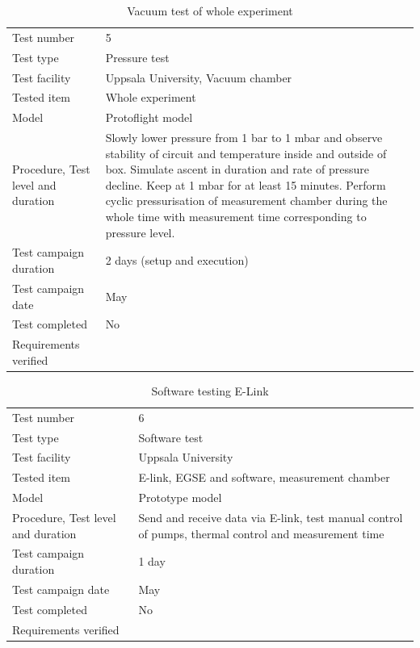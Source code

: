 \documentclass[12pt,a4paper]{report}
\begin{document}
\begin{table}[H]
\centering
\caption{Vacuum test of whole experiment}
\label{tab:vacuum_test}
\begin{tabular}{L{5cm}L{10cm}}
\toprule
Test number & 5 \\
Test type & Pressure test \\
Test facility & Uppsala University, Vacuum chamber \\
Tested item & Whole experiment \\
Model & Protoflight model \\
Procedure, Test level and duration & Slowly lower pressure from 1 bar to 1 mbar and observe stability of circuit and temperature inside and outside of box. Simulate ascent in duration and rate of pressure decline. Keep at 1 mbar for at least 15 minutes. Perform cyclic pressurisation of measurement chamber during the whole time with measurement time corresponding to pressure level. \\
Test campaign duration & 2 days (setup and execution) \\
Test campaign date & May \\
Test completed & No \\
Requirements verified & \\
\bottomrule
\end{tabular}
\end{table}


\begin{table}[H]
\centering
\caption{Software testing E-Link}
\label{tab:test6}
\begin{tabular}{L{5cm}L{10cm}}
\toprule
Test number & 6 \\
Test type & Software test \\
Test facility & Uppsala University \\
Tested item & E-link, EGSE and software, measurement chamber \\
Model & Prototype model \\
Procedure, Test level and duration & Send and receive data via E-link, test manual control of pumps, thermal control and measurement time \\
Test campaign duration & 1 day \\
Test campaign date & May \\
Test completed & No \\
Requirements verified & \\
\bottomrule
\end{tabular}
\end{table}
\end{document}
